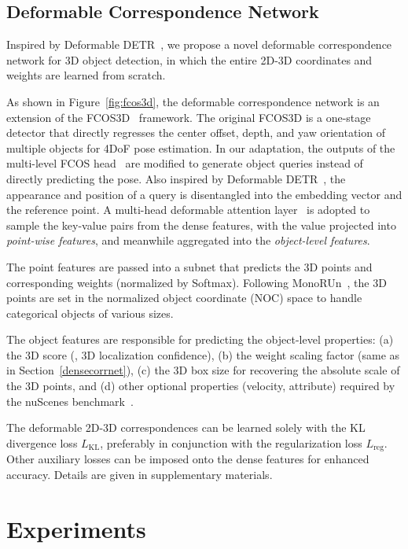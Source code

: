 \documentclass[10pt,twocolumn,letterpaper]{article}
\begin{document}
\subsection{Deformable Correspondence Network} \label{deformnetmain}
Inspired by Deformable DETR~\cite{deformabledetr}, we propose a novel deformable correspondence network for 3D object detection, in which the entire 2D-3D coordinates and weights are learned from scratch.

As shown in Figure~\ref{fig:fcos3d}, the deformable correspondence network is an extension of the FCOS3D~\cite{fcos3d} framework. The original FCOS3D is a one-stage detector that directly regresses the center offset, depth, and yaw orientation of multiple objects for 4DoF pose estimation. In our adaptation, the outputs of the multi-level FCOS head~\cite{fcos} are modified to generate object queries instead of directly predicting the pose. Also inspired by Deformable DETR~\cite{deformabledetr}, the appearance and position of a query is disentangled into the embedding vector and the reference point. A multi-head deformable attention layer~\cite{deformabledetr} is adopted to sample the key-value pairs from the dense features, with the value projected into \emph{point-wise features}, and meanwhile aggregated into the \emph{object-level features}. 

The point features are passed into a subnet that predicts the 3D points and corresponding weights (normalized by Softmax). Following MonoRUn~\cite{monorun}, the 3D points are set in the normalized object coordinate (NOC) space to handle categorical objects of various sizes.

The object features are 
responsible for predicting the object-level properties: (a) the 3D score (\ie, 3D localization confidence), (b) the weight scaling factor (same as in Section~\ref{densecorrnet}), (c) the 3D box size for recovering the absolute scale of the 3D points, and (d) other optional properties (velocity, attribute) required by the nuScenes benchmark~\cite{nuscenes}.

The deformable 2D-3D correspondences can be learned solely with the KL divergence loss $L_\text{KL}$,
preferably in conjunction with the regularization loss $L_\text{reg}$. Other auxiliary losses can be imposed onto the dense features for enhanced accuracy. Details are given in supplementary materials.

\section{Experiments}
\end{document}
